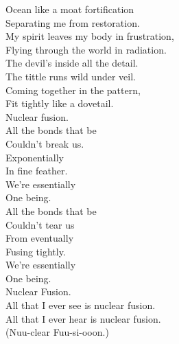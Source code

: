 Ocean like a moat fortification \\
Separating me from restoration. \\
My spirit leaves my body in frustration, \\
Flying through the world in radiation. \\

The devil's inside all the detail. \\
The tittle runs wild under veil. \\
Coming together in the pattern, \\
Fit tightly like a dovetail. \\

Nuclear fusion. \\

All the bonds that be \\
Couldn't break us. \\
Exponentially \\
In fine feather. \\
We're essentially \\
One being. \\

All the bonds that be \\
Couldn't tear us \\
From eventually \\
Fusing tightly. \\
We're essentially \\
One being. \\
Nuclear Fusion. \\

All that I ever see is nuclear fusion. \\
All that I ever hear is nuclear fusion. \\

(Nuu-clear Fuu-si-ooon.) \\




